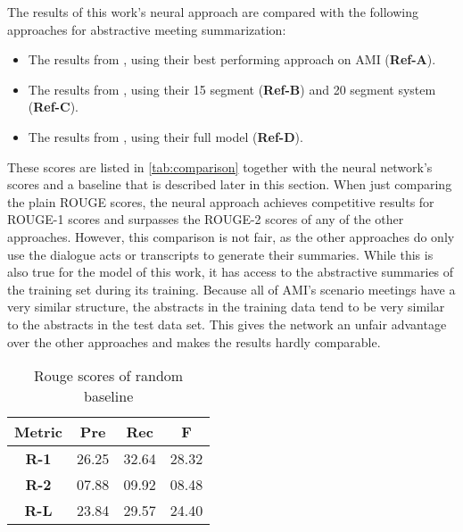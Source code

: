 The results of this work's neural approach are compared with the following approaches for abstractive meeting summarization:
\begin{itemize}
\item The results from \cite{shang-etal-2018-unsupervised}, using their best performing approach on AMI (\textbf{Ref-A}).
\item The results from \cite{oya-etal-2014-template}, using their 15 segment (\textbf{Ref-B}) and 20 segment system (\textbf{Ref-C}).
\item The results from \cite{mehdad-etal-2013-abstractive}, using their full model (\textbf{Ref-D}).
\end{itemize}

These scores are listed in \cref{tab:comparison} together with the neural network's scores and a baseline that is described later in this section.
When just comparing the plain ROUGE scores, the neural approach achieves competitive results for ROUGE-1 scores and surpasses the ROUGE-2 scores of any of the other approaches.
However, this comparison is not fair, as the other approaches do only use the dialogue acts or transcripts to generate their summaries.
While this is also true for the model of this work, it has access to the abstractive summaries of the training set during its training.
Because all of AMI's scenario meetings have a very similar structure, the abstracts in the training data tend to be very similar to the abstracts in the test data set.
This gives the network an unfair advantage over the other approaches and makes the results hardly comparable.

\begin{table}[h]
\centering
\begin{tabular}{@{}clll@{}}
\toprule
\textbf{Metric} & \multicolumn{1}{c}{\textbf{Pre}} & \multicolumn{1}{c}{\textbf{Rec}} & \multicolumn{1}{c}{\textbf{F}} \\ \midrule
\textbf{R-1}    & 26.25                           & 32.64                           & 28.32                         \\
\textbf{R-2}    & 07.88                           & 09.92                           & 08.48                         \\
\textbf{R-L}    & 23.84                           & 29.57                           & 24.40                         \\ \bottomrule
\end{tabular}
\caption{Rouge scores of random baseline}
\label{tab:extended-experiment-rouge-random}
\end{table}

